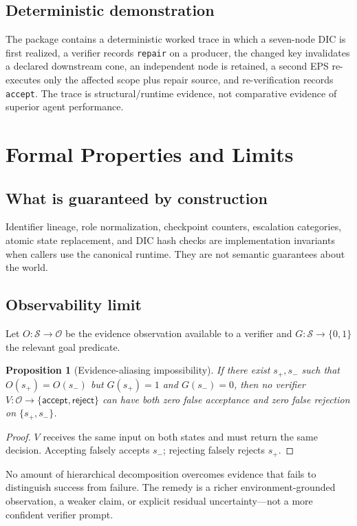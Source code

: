 \documentclass[11pt,a4paper]{article}
\newtheorem{proposition}[definition]{Proposition}
\newcommand{\State}{\mathcal S}
\begin{document}
\subsection{Deterministic demonstration}
The package contains a deterministic worked trace in which a seven-node DIC is first realized, a verifier records \texttt{repair} on a producer, the changed key invalidates a declared downstream cone, an independent node is retained, a second EPS re-executes only the affected scope plus repair source, and re-verification records \texttt{accept}. The trace is structural/runtime evidence, not comparative evidence of superior agent performance.

\section{Formal Properties and Limits}
\subsection{What is guaranteed by construction}
Identifier lineage, role normalization, checkpoint counters, escalation categories, atomic state replacement, and DIC hash checks are implementation invariants when callers use the canonical runtime. They are not semantic guarantees about the world.

\subsection{Observability limit}
Let $O:\State\to\mathcal O$ be the evidence observation available to a verifier and $G:\State\to\{0,1\}$ the relevant goal predicate.
\begin{proposition}[Evidence-aliasing impossibility]
\label{prop:observability}
If there exist $s_+,s_-$ such that $O(s_+)=O(s_-)$ but $G(s_+)=1$ and $G(s_-)=0$, then no verifier $V:\mathcal O\to\{\textsf{accept},\textsf{reject}\}$ can have both zero false acceptance and zero false rejection on $\{s_+,s_-\}$.
\end{proposition}
\begin{proof}
$V$ receives the same input on both states and must return the same decision. Accepting falsely accepts $s_-$; rejecting falsely rejects $s_+$.
\end{proof}
No amount of hierarchical decomposition overcomes evidence that fails to distinguish success from failure. The remedy is a richer environment-grounded observation, a weaker claim, or explicit residual uncertainty---not a more confident verifier prompt.
\end{document}
